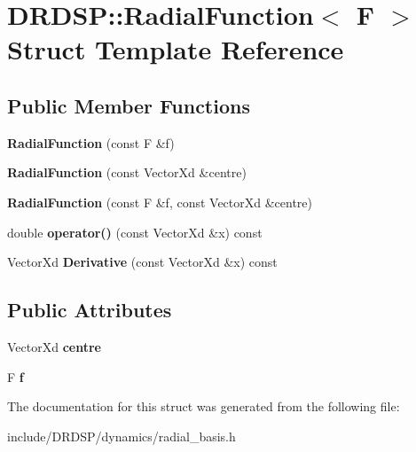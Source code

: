 \hypertarget{struct_d_r_d_s_p_1_1_radial_function}{\section{D\-R\-D\-S\-P\-:\-:Radial\-Function$<$ F $>$ Struct Template Reference}
\label{struct_d_r_d_s_p_1_1_radial_function}
}
\subsection*{Public Member Functions}
\begin{DoxyCompactItemize}
\item 
\hypertarget{struct_d_r_d_s_p_1_1_radial_function_a0f8a6a2771d2e11e297872a3ed0d70e5}{{\bfseries Radial\-Function} (const F \&f)}\label{struct_d_r_d_s_p_1_1_radial_function_a0f8a6a2771d2e11e297872a3ed0d70e5}

\item 
\hypertarget{struct_d_r_d_s_p_1_1_radial_function_a3ed79a8827de375b84c8d81511797234}{{\bfseries Radial\-Function} (const Vector\-Xd \&centre)}\label{struct_d_r_d_s_p_1_1_radial_function_a3ed79a8827de375b84c8d81511797234}

\item 
\hypertarget{struct_d_r_d_s_p_1_1_radial_function_aad20f268659b01f1fc32a4bad0f6fb90}{{\bfseries Radial\-Function} (const F \&f, const Vector\-Xd \&centre)}\label{struct_d_r_d_s_p_1_1_radial_function_aad20f268659b01f1fc32a4bad0f6fb90}

\item 
\hypertarget{struct_d_r_d_s_p_1_1_radial_function_aeee436a09312d98af265b2533e9717ca}{double {\bfseries operator()} (const Vector\-Xd \&x) const }\label{struct_d_r_d_s_p_1_1_radial_function_aeee436a09312d98af265b2533e9717ca}

\item 
\hypertarget{struct_d_r_d_s_p_1_1_radial_function_a44823b21f924f6d15c9b0171b2b9565a}{Vector\-Xd {\bfseries Derivative} (const Vector\-Xd \&x) const }\label{struct_d_r_d_s_p_1_1_radial_function_a44823b21f924f6d15c9b0171b2b9565a}

\end{DoxyCompactItemize}
\subsection*{Public Attributes}
\begin{DoxyCompactItemize}
\item 
\hypertarget{struct_d_r_d_s_p_1_1_radial_function_a4ac946a696aa574ec984ed5fe2f2031e}{Vector\-Xd {\bfseries centre}}\label{struct_d_r_d_s_p_1_1_radial_function_a4ac946a696aa574ec984ed5fe2f2031e}

\item 
\hypertarget{struct_d_r_d_s_p_1_1_radial_function_abaa10610b658d58c03eafb5bf6bfb7cf}{F {\bfseries f}}\label{struct_d_r_d_s_p_1_1_radial_function_abaa10610b658d58c03eafb5bf6bfb7cf}

\end{DoxyCompactItemize}


The documentation for this struct was generated from the following file\-:\begin{DoxyCompactItemize}
\item 
include/\-D\-R\-D\-S\-P/dynamics/radial\-\_\-basis.\-h\end{DoxyCompactItemize}
